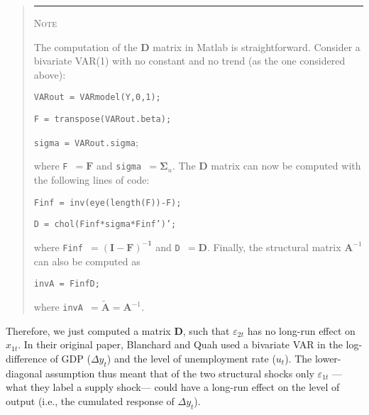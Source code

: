 \documentclass[11pt,a4paper]{report}
\numberwithin{equation}{chapter}
\numberwithin{section}{chapter}
\begin{document}
%
\begin{quotation}
\noindent \rule{1cm}{.4pt}   {\scshape Note}   \hrulefill
\vspace{-.36cm}

\noindent \hrulefill
\small
\singlespacing
\color{note}\sffamily%

The computation of the $\mathbf{D}$ matrix in Matlab is straightforward.
Consider a bivariate VAR(1) with no constant and no trend (as the one
considered above):\medskip

\texttt{VARout = VARmodel(Y,0,1);}

\texttt{F = transpose(VARout.beta);}

\texttt{sigma = VARout.sigma}\medskip ;

\noindent where \texttt{F }$\mathbf{=F}$ and \texttt{sigma }$=\mathbf{\Sigma 
}_{u}$. The $\mathbf{D}$ matrix can now be computed with the following lines
of code:\medskip

\texttt{Finf = inv(eye(length(F))-F);}

\texttt{D = chol(Finf*sigma*Finf')';}\medskip

\noindent where \texttt{Finf }$\mathbf{=\left( \mathbf{I}-\mathbf{F}\right)
^{-1}}$ and \texttt{D }$\mathbf{=D}$. Finally, the structural matrix $%
\mathbf{A}^{-1}$ can also be computed as\medskip

\texttt{invA = Finf\TEXTsymbol{\backslash}D;}\medskip

\noindent where \texttt{invA }$=\mathbf{\tilde{A}}=\mathbf{A}^{-1}$.

%
\color{black}
\noindent \hrulefill 
\vspace{-.5cm}

\noindent \hrulefill
\end{quotation}
\bigskip%

Therefore, we just computed a matrix $\mathbf{D}$, such that $\varepsilon
_{2t}$ has no long-run effect on $x_{1t}$. In their original paper,
Blanchard and Quah used a bivariate VAR in the log-difference of GDP ($%
\Delta y_{t}$) and the level of unemployment rate ($u_{t}$). The
lower-diagonal assumption thus meant that of the two structural shocks only $%
\varepsilon _{1t}$ ---what they label a supply shock--- could have a
long-run effect on the level of output (i.e., the cumulated response of $%
\Delta y_{t}$).
\end{document}

